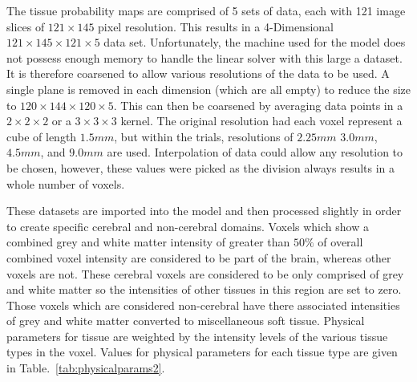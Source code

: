 \documentclass[11pt,english,a4paper,twoside,openright]{report}
\begin{document}
{{{{{{{{The tissue probability maps are comprised of 5 sets of data, each with 121 image slices of $121\times145$ pixel resolution. This results in a 4-Dimensional $121\times145\times121\times5$ data set. Unfortunately, the machine used for the model does not possess enough memory to handle the linear solver with this large a dataset. It is therefore coarsened to allow various resolutions of the data to be used. A single plane is removed in each dimension (which are all empty) to reduce the size to $120\times144\times120\times5$. This can then be coarsened by averaging data points in a $2\times2\times2$ or a $3\times3\times3$ kernel. The original resolution had each voxel represent a cube of length $1.5mm$, but within the trials, resolutions of $2.25mm$ $3.0mm$, $4.5mm$, and $9.0mm$ are used. Interpolation of data could allow any resolution to be chosen, however, these values were picked as the division always results in a whole number of voxels.

These datasets are imported into the model and then processed slightly in order to create specific cerebral and non-cerebral domains. Voxels which show a combined grey and white matter intensity of greater than $50\%$ of overall combined voxel intensity are considered to be part of the brain, whereas other voxels are not. These cerebral voxels are considered to be only comprised of grey and white matter so the intensities of other tissues in this region are set to zero. Those voxels which are considered non-cerebral have there associated intensities of grey and white matter converted to miscellaneous soft tissue. Physical parameters for tissue are weighted by the intensity levels of the various tissue types in the voxel. Values for physical parameters for each tissue type are given in Table.~\ref{tab:physicalparams2}.

}}}}}}}}
\end{document}
